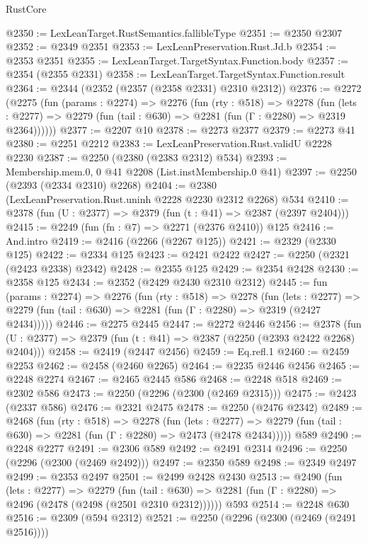\begin{lexlean}{RustCore}
\begin{coremodule}
@2350 := LexLeanTarget.RustSemantics.fallibleType
@2351 := @2350 @2307
@2352 := @2349 @2351
@2353 := LexLeanPreservation.Rust.Jd.b
@2354 := @2353 @2351
@2355 := LexLeanTarget.TargetSyntax.Function.body
@2357 := @2354 (@2355 @2331)
@2358 := LexLeanTarget.TargetSyntax.Function.result
@2364 := @2344 (@2352 (@2357 (@2358 @2331) @2310 @2312))
@2376 := @2272
    (@2275
      (fun (params : @2274) =>
      @2276
        (fun (rty : @518) =>
        @2278
          (fun (lets : @2277) =>
          @2279 (fun (tail : @630) => @2281 (fun (Γ : @2280) => @2319 @2364))))))
@2377 := @2207 @10
@2378 := @2273 @2377
@2379 := @2273 @41
@2380 := @2251 @2212
@2383 := LexLeanPreservation.Rust.validU @2228 @2230
@2387 := @2250 (@2380 (@2383 @2312) @534)
@2393 := Membership.mem.{0, 0} @41 @2208 (List.instMembership.{0} @41)
@2397 := @2250 (@2393 (@2334 @2310) @2268)
@2404 := @2380 (LexLeanPreservation.Rust.uninh @2228 @2230 @2312 @2268) @534
@2410 := @2378 (fun (U : @2377) => @2379 (fun (t : @41) => @2387 (@2397 @2404)))
@2415 := @2249 (fun (fn : @7) => @2271 (@2376 @2410)) @125
@2416 := And.intro
@2419 := @2416 (@2266 (@2267 @125))
@2421 := @2329 (@2330 @125)
@2422 := @2334 @125
@2423 := @2421 @2422
@2427 := @2250 (@2321 (@2423 @2338) @2342)
@2428 := @2355 @125
@2429 := @2354 @2428
@2430 := @2358 @125
@2434 := @2352 (@2429 @2430 @2310 @2312)
@2445 := fun (params : @2274) =>
  @2276
    (fun (rty : @518) =>
    @2278
      (fun (lets : @2277) =>
      @2279 (fun (tail : @630) => @2281 (fun (Γ : @2280) => @2319 (@2427 @2434)))))
@2446 := @2275 @2445
@2447 := @2272 @2446
@2456 := @2378 (fun (U : @2377) => @2379 (fun (t : @41) => @2387 (@2250 (@2393 @2422 @2268) @2404)))
@2458 := @2419 (@2447 @2456)
@2459 := Eq.refl.{1}
@2460 := @2459 @2253
@2462 := @2458 (@2460 @2265)
@2464 := @2235 @2446 @2456
@2465 := @2248 @2274
@2467 := @2465 @2445 @586
@2468 := @2248 @518
@2469 := @2302 @586
@2473 := @2250 (@2296 (@2300 (@2469 @2315)))
@2475 := @2423 (@2337 @586)
@2476 := @2321 @2475
@2478 := @2250 (@2476 @2342)
@2489 := @2468
    (fun (rty : @518) =>
    @2278
      (fun (lets : @2277) =>
      @2279 (fun (tail : @630) => @2281 (fun (Γ : @2280) => @2473 (@2478 @2434)))))
    @589
@2490 := @2248 @2277
@2491 := @2306 @589
@2492 := @2491 @2314
@2496 := @2250 (@2296 (@2300 (@2469 @2492)))
@2497 := @2350 @589
@2498 := @2349 @2497
@2499 := @2353 @2497
@2501 := @2499 @2428 @2430
@2513 := @2490
    (fun (lets : @2277) =>
    @2279
      (fun (tail : @630) => @2281 (fun (Γ : @2280) => @2496 (@2478 (@2498 (@2501 @2310 @2312))))))
    @593
@2514 := @2248 @630
@2516 := @2309 (@594 @2312)
@2521 := @2250 (@2296 (@2300 (@2469 (@2491 @2516))))

\end{coremodule}
\end{lexlean}

